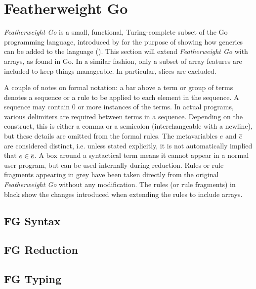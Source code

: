 \section{Featherweight Go}

\emph{Featherweight Go} is a small, functional, Turing-complete subset of the Go
programming language, introduced by \citeauthor{fg} for the purpose of showing
how generics can be added to the language (\citeyear{fg}). This section will
extend \emph{Featherweight Go} with arrays, as found in Go. In a similar
fashion, only a subset of array features are included to keep things manageable.
In particular, slices are excluded.

A couple of notes on formal notation: a bar above a term or group of terms
denotes a sequence or a rule to be applied to each element in the sequence. A
sequence may contain 0 or more instances of the terms. In actual programs,
various delimiters are required between terms in a sequence. Depending on the
construct, this is either a comma or a semicolon (interchangeable with a
newline), but these details are omitted from the formal rules. The metavariables
$e$ and $\overline{e}$ are considered distinct, i.e. unless stated explicitly, it is
not automatically implied that $e \in \overline{e}$. A box around a syntactical term
means it cannot appear in a normal user program, but can be used internally
during reduction. Rules or rule fragments appearing in grey have been taken
directly from the original \emph{Featherweight Go} \autocite{fg} without any
modification. The rules (or rule fragments) in black show the changes introduced
when extending the rules to include arrays.

\subsection{FG Syntax}



\subsection{FG Reduction}



\subsection{FG Typing}





